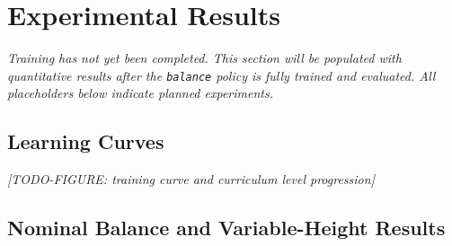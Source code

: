 \documentclass[conference]{IEEEtran}
\begin{document}
\section{Experimental Results}
\label{sec:results}

\textit{Training has not yet been completed.
This section will be populated with quantitative results after the
\texttt{balance} policy is fully trained and evaluated.
All placeholders below indicate planned experiments.}

\subsection{Learning Curves}
\textit{[TODO-FIGURE: training curve and curriculum level progression]}

\subsection{Nominal Balance and Variable-Height Results}

\begin{table}[ht]
\centering
\caption{Variable-height balancing: performance vs.\ commanded height.
All values pending training completion.}
\label{tab:balance_results}
\end{table}
\end{document}
